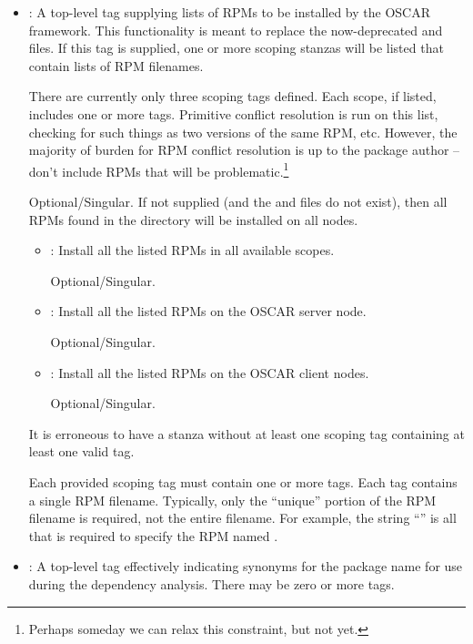 \begin{itemize}
\item {}: A top-level tag supplying lists of RPMs to be
  installed by the OSCAR framework.  This functionality is meant to
  replace the now-deprecated  and
   files.  If this tag is supplied, one or more
  scoping stanzas will be listed that contain lists of RPM filenames.  
    
  There are currently only three scoping tags defined.  Each scope, if
  listed, includes one or more  tags.  Primitive conflict
  resolution is run on this list, checking for such things as two
  versions of the same RPM, etc.  However, the majority of burden for
  RPM conflict resolution is up to the package author -- don't include
  RPMs that will be problematic.\footnote{Perhaps someday we can relax
    this constraint, but not yet.}

  Optional/Singular.  If not supplied (and the 
  and  files do not exist), then all RPMs found
  in the  directory will be installed on all nodes.  
  
  \begin{itemize}
  \item {}: Install all the listed RPMs in all available
    scopes.

    Optional/Singular.
    
  \item {}: Install all the listed RPMs on the OSCAR
    server node.

    Optional/Singular.
    
  \item {}: Install all the listed RPMs on the OSCAR
    client nodes.

    Optional/Singular.
  \end{itemize}
  
  It is erroneous to have a  stanza without at least
  one scoping tag containing at least one valid  tag.
  
  Each provided scoping tag must contain one or more 
  tags.  Each  tag contains a single RPM filename.
  Typically, only the ``unique'' portion of the RPM filename is
  required, not the entire filename.  For example, the string
  ``'' is all that is required to specify the RPM
  named .

\item {}: A top-level tag effectively indicating
  synonyms for the package name for use during the dependency
  analysis.  There may be zero or more  tags.
  

\end{itemize}
